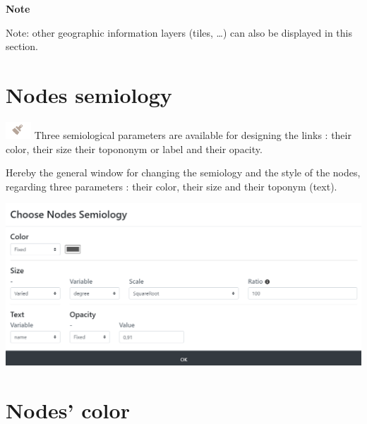 \documentclass[
  letterpaper,
  DIV=11,
  numbers=noendperiod]{scrreprt}
\begin{document}
\begin{tcolorbox}[enhanced jigsaw, rightrule=.15mm, bottomrule=.15mm, colback=white, breakable, opacityback=0, colframe=quarto-callout-note-color-frame, toprule=.15mm, leftrule=.75mm, arc=.35mm, left=2mm]
\begin{minipage}[t]{5.5mm}
\textcolor{quarto-callout-note-color}{\faInfo}
\end{minipage}%
\begin{minipage}[t]{\textwidth - 5.5mm}

\vspace{-3mm}\textbf{Note}\vspace{3mm}

Note: other geographic information layers (tiles, \ldots) can also be
displayed in this section.

\end{minipage}%
\end{tcolorbox}

\section{Nodes semiology}\label{nodes-semiology}

\includegraphics{images/Buton_action_semio.png} Three semiological
parameters are available for designing the links : their color, their
size their topononym or label and their opacity.

Hereby the general window for changing the semiology and the style of
the nodes, regarding three parameters : their color, their size and
their toponym (text).

\begin{center}
\includegraphics{images/Nodes_semio.PNG}
\end{center}

\section{\texorpdfstring{\textbf{Nodes'
color}}{Nodes' color}}\label{nodes-color}
\end{document}
